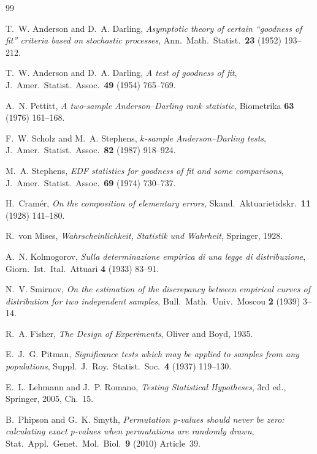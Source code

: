 \documentclass[11pt,a4paper]{article}
\theoremstyle{definition}
\theoremstyle{plain}
\theoremstyle{remark}
\begin{document}
\begin{thebibliography}{99}

T.~W. Anderson and D.~A. Darling,
\emph{Asymptotic theory of certain ``goodness of fit'' criteria based on
stochastic processes},
Ann.\ Math.\ Statist.\ \textbf{23} (1952) 193--212.

T.~W. Anderson and D.~A. Darling,
\emph{A test of goodness of fit},
J.\ Amer.\ Statist.\ Assoc.\ \textbf{49} (1954) 765--769.

A.~N. Pettitt,
\emph{A two-sample Anderson--Darling rank statistic},
Biometrika \textbf{63} (1976) 161--168.

F.~W. Scholz and M.~A. Stephens,
\emph{$k$-sample Anderson--Darling tests},
J.\ Amer.\ Statist.\ Assoc.\ \textbf{82} (1987) 918--924.

M.~A. Stephens,
\emph{EDF statistics for goodness of fit and some comparisons},
J.\ Amer.\ Statist.\ Assoc.\ \textbf{69} (1974) 730--737.

H.~Cram\'er,
\emph{On the composition of elementary errors},
Skand.\ Aktuarietidskr.\ \textbf{11} (1928) 141--180.

R.~von Mises,
\emph{Wahrscheinlichkeit, Statistik und Wahrheit}, Springer, 1928.

A.~N. Kolmogorov,
\emph{Sulla determinazione empirica di una legge di distribuzione},
Giorn.\ Ist.\ Ital.\ Attuari \textbf{4} (1933) 83--91.

N.~V. Smirnov,
\emph{On the estimation of the discrepancy between empirical curves of
distribution for two independent samples},
Bull.\ Math.\ Univ.\ Moscou \textbf{2} (1939) 3--14.

R.~A. Fisher, \emph{The Design of Experiments}, Oliver and Boyd, 1935.

E.~J.~G. Pitman,
\emph{Significance tests which may be applied to samples from any populations},
Suppl.\ J.\ Roy.\ Statist.\ Soc.\ \textbf{4} (1937) 119--130.

E.~L. Lehmann and J.~P. Romano,
\emph{Testing Statistical Hypotheses}, 3rd ed., Springer, 2005, Ch.~15.

B.~Phipson and G.~K. Smyth,
\emph{Permutation p-values should never be zero: calculating exact p-values when
permutations are randomly drawn},
Stat.\ Appl.\ Genet.\ Mol.\ Biol.\ \textbf{9} (2010) Article~39.


\end{thebibliography}
\end{document}

